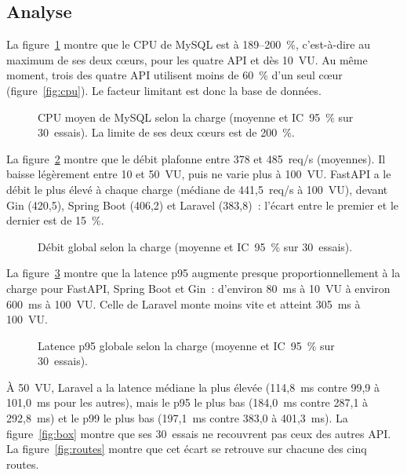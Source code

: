 \documentclass[conference,a4paper]{IEEEtran}
\begin{document}
\begin{table}[t]
\caption{Synthèse des mesures (médianes sur 30~essais de 15~s)}
\label{tab:resultats}
\centering

\end{table}

\subsection{Analyse}
La figure~\ref{fig:mysql} montre que le CPU de MySQL est à
189--200~\%, c'est-à-dire au maximum de ses deux cœurs, pour les quatre
API et dès 10~VU. Au même moment, trois des quatre API utilisent moins
de 60~\% d'un seul cœur (figure~\ref{fig:cpu}). Le facteur limitant est
donc la base de données.

\begin{figure}[htbp]
\centering

\caption{CPU moyen de MySQL selon la charge (moyenne et IC~95~\% sur
30~essais). La limite de ses deux cœurs est de 200~\%.}
\label{fig:mysql}
\end{figure}

La figure~\ref{fig:debit} montre que le débit plafonne entre 378 et
485~req/s (moyennes). Il baisse légèrement entre 10 et 50~VU, puis ne varie plus
à 100~VU. FastAPI a le débit le plus élevé à chaque charge (médiane de
441,5~req/s à 100~VU), devant Gin (420,5), Spring Boot (406,2) et
Laravel (383,8)~: l'écart entre le premier et le dernier est de
15~\%.

\begin{figure}[htbp]
\centering

\caption{Débit global selon la charge (moyenne et IC~95~\% sur
30~essais).}
\label{fig:debit}
\end{figure}

La figure~\ref{fig:p95} montre que la latence p95 augmente presque
proportionnellement à la charge pour FastAPI, Spring Boot et Gin~:
d'environ 80~ms à 10~VU à environ 600~ms à 100~VU. Celle de Laravel
monte moins vite et atteint 305~ms à 100~VU.

\begin{figure}[htbp]
\centering

\caption{Latence p95 globale selon la charge (moyenne et IC~95~\% sur
30~essais).}
\label{fig:p95}
\end{figure}

À 50~VU, Laravel a la latence médiane la plus élevée (114,8~ms contre
99,9 à 101,0~ms pour les autres), mais le p95 le plus bas (184,0~ms
contre 287,1 à 292,8~ms) et le p99 le plus bas (197,1~ms contre 383,0
à 401,3~ms). La figure~\ref{fig:box} montre que ses 30~essais ne
recouvrent pas ceux des autres API. La figure~\ref{fig:routes} montre
que cet écart se retrouve sur chacune des cinq routes.
\end{document}
